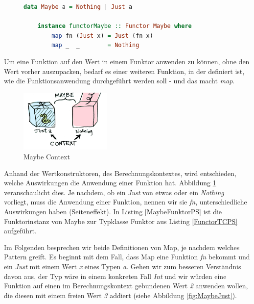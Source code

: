 \documentclass[
12pt,
ngerman,
oneside]
{scrbook} %
\begin{document}
 \begin{figure}
	\begin{lstlisting}[aboveskip=-1em, language=purescript, caption=ADT Maybe u. Funktorinstanz, label=MaybeFunktorPS]
	data Maybe a = Nothing | Just a
	
	instance functorMaybe :: Functor Maybe where
		map fn (Just x) = Just (fn x)
		map _  _        = Nothing
	\end{lstlisting}
\end{figure}

Um eine Funktion auf den Wert in einem Funktor anwenden zu können, ohne den Wert vorher auszupacken, bedarf es einer weiteren Funktion, in der definiert ist, wie die Funktionsanwendung durchgeführt werden soll - und das macht \emph{map}. 

\begin{figure} %
	\begin{center}
		\includegraphics[width=0.4\textwidth]{Pictures/context.png}
	\end{center}
	\caption{Maybe Context \cite[][]{AdityaBhargava13}}
	\label{fig:ContextMaybe}
\end{figure}

Anhand der Wertkonstruktoren, des Berechnungskontextes, wird entschieden, welche Auswirkungen die Anwendung einer Funktion hat. Abbildung \ref{fig:ContextMaybe} veranschaulicht dies. Je nachdem, ob ein \emph{Just} von etwas oder ein \emph{Nothing} vorliegt, muss die Anwendung einer Funktion, nennen wir sie \emph{fn}, unterschiedliche Auswirkungen haben (Seiteneffekt). In Listing \ref{MaybeFunktorPS} ist die Funktorinstanz von Maybe zur Typklasse Funktor aus Listing \ref{FunctorTCPS} aufgeführt.

Im Folgenden besprechen wir beide Definitionen von Map, je nachdem welches Pattern greift. Es beginnt mit dem Fall, dass Map eine Funktion \emph{fn} bekommt und ein \emph{Just} mit einem Wert \emph{x} eines Typen \emph{a}. Gehen wir zum besseren Verständnis davon aus, der Typ wäre in einem konkreten Fall \emph{Int} und wir würden eine Funktion auf einen im Berechnungskontext gebundenen Wert \emph{2} anwenden wollen, die diesen mit einem freien Wert \emph{3} addiert (siehe Abbildung \ref{fig:MaybeJust}).
\end{document}

